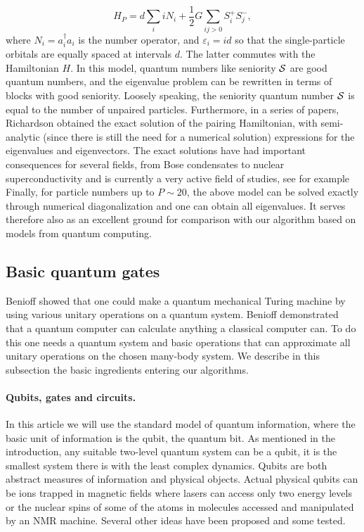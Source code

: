\documentclass[%
oneside,                 %
final,                   %
10pt]{article}
\begin{document}
\begin{equation*}
   H_P=d\sum_iiN_i+
     \frac{1}{2} G\sum_{ij>0}S^+_iS^-_j,
\end{equation*}
where  $N_i=a^{\dagger}_i a_i$
is the number operator, and 
$\varepsilon_i = id$ so that the single-particle orbitals 
are equally spaced at intervals $d$. The latter commutes with the 
Hamiltonian $H$. In this model, quantum numbers like seniority 
$\cal{S}$ are good quantum numbers, and the eigenvalue problem 
can be rewritten in terms of blocks with good seniority. 
Loosely 
speaking, the seniority quantum number $\cal{S}$ is equal to 
the number of unpaired particles.
Furthermore, in  a series of papers, Richardson
obtained the exact solution of the pairing Hamiltonian, with 
semi-analytic (since there is still the need for a numerical solution) 
expressions for the eigenvalues and eigenvectors. The exact solutions
have had important consequences for several fields, from Bose condensates to
nuclear superconductivity and is currently a very active field of studies, see for example
Finally, for particle numbers up to $P \sim 20$, the above model can be 
solved exactly through numerical diagonalization and one can obtain all eigenvalues.
It serves therefore also as an excellent ground for comparison with our algorithm based
on models from quantum computing.

\subsection{Basic quantum  gates}

Benioff showed that one could make a quantum mechanical Turing machine
by using various  unitary operations on a quantum system.
Benioff  demonstrated 
that a quantum computer can calculate anything a
classical computer can. To do this one needs a quantum system and
basic operations that can approximate all unitary operations
on the chosen many-body system. We describe in this subsection the basic ingredients entering 
our algorithms.

\paragraph{Qubits, gates and circuits.}
In this article we will use the standard model of quantum information,
where
the basic unit of information is the qubit, the quantum bit. 
As mentioned in the introduction, any
suitable 
two-level quantum system can be a qubit, 
it is the smallest system there is with the
least complex dynamics.
Qubits are both abstract measures of information and physical objects.
Actual physical qubits can be ions trapped in magnetic fields where
lasers can access only two energy levels or  the nuclear spins of some of
the atoms in molecules accessed and manipulated by an NMR machine.
Several other ideas have been proposed and some tested.
\end{document}
